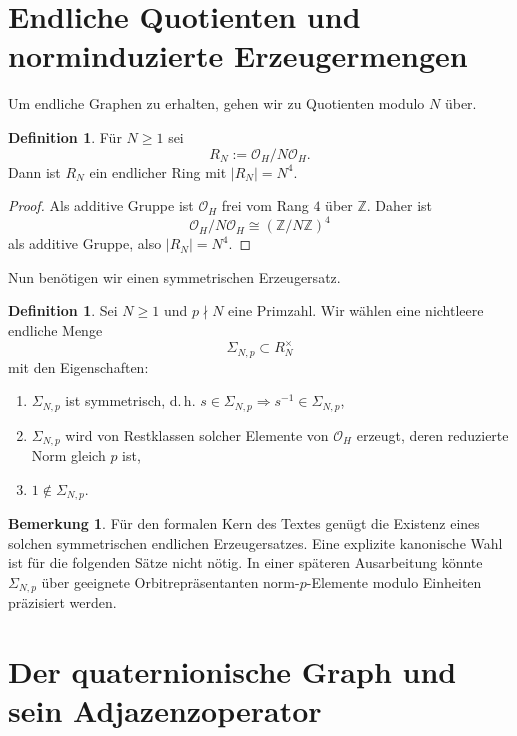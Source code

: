 \documentclass[12pt,a4paper]{article}
\newcommand{\ZZ}{\mathbb{Z}}
\newcommand{\OO}{\mathcal{O}}
\theoremstyle{definition}
\newtheorem{definition}[theorem]{Definition}
\newtheorem{remark}[theorem]{Bemerkung}
\begin{document}
	\section{Endliche Quotienten und norminduzierte Erzeugermengen}
	
	Um endliche Graphen zu erhalten, gehen wir zu Quotienten modulo \(N\) über.
	
	\begin{definition}
		Für \(N\ge 1\) sei
		\[
		R_N := \OO_H / N\OO_H.
		\]
		Dann ist \(R_N\) ein endlicher Ring mit \(|R_N|=N^4\).
	\end{definition}
	
	\begin{proof}
		Als additive Gruppe ist \(\OO_H\) frei vom Rang \(4\) über \(\ZZ\). Daher ist
		\[
		\OO_H/N\OO_H \cong (\ZZ/N\ZZ)^4
		\]
		als additive Gruppe, also \(|R_N|=N^4\).
	\end{proof}
	
	Nun benötigen wir einen symmetrischen Erzeugersatz.
	
	\begin{definition}
		Sei \(N\ge 1\) und \(p\nmid N\) eine Primzahl. Wir wählen eine nichtleere endliche Menge
		\[
		\Sigma_{N,p}\subset R_N^\times
		\]
		mit den Eigenschaften:
		\begin{enumerate}[label=(\roman*)]
			\item \(\Sigma_{N,p}\) ist symmetrisch, d.\,h. \(s\in\Sigma_{N,p}\Rightarrow s^{-1}\in\Sigma_{N,p}\),
			\item \(\Sigma_{N,p}\) wird von Restklassen solcher Elemente von \(\OO_H\) erzeugt, deren reduzierte Norm gleich \(p\) ist,
			\item \(1\notin\Sigma_{N,p}\).
		\end{enumerate}
	\end{definition}
	
	\begin{remark}
		Für den formalen Kern des Textes genügt die Existenz eines solchen symmetrischen endlichen Erzeugersatzes. Eine explizite kanonische Wahl ist für die folgenden Sätze nicht nötig. In einer späteren Ausarbeitung könnte \(\Sigma_{N,p}\) über geeignete Orbitrepräsentanten norm-\(p\)-Elemente modulo Einheiten präzisiert werden.
	\end{remark}
	
	\section{Der quaternionische Graph und sein Adjazenzoperator}
	
\end{document}
